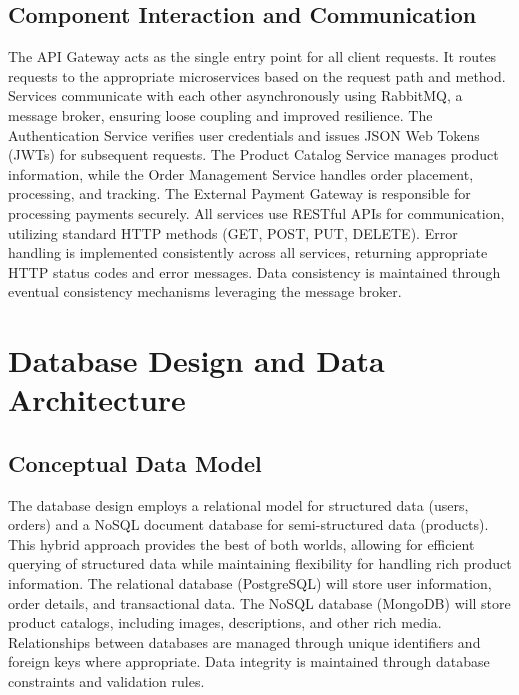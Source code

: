 \documentclass[11pt,a4paper,oneside]{article}
\begin{document}
\subsection{Component Interaction and Communication}

The API Gateway acts as the single entry point for all client requests.  It routes requests to the appropriate microservices based on the request path and method.  Services communicate with each other asynchronously using RabbitMQ, a message broker, ensuring loose coupling and improved resilience.  The Authentication Service verifies user credentials and issues JSON Web Tokens (JWTs) for subsequent requests. The Product Catalog Service manages product information,  while the Order Management Service handles order placement, processing, and tracking. The External Payment Gateway is responsible for processing payments securely.  All services use RESTful APIs for communication, utilizing standard HTTP methods (GET, POST, PUT, DELETE).  Error handling is implemented consistently across all services, returning appropriate HTTP status codes and error messages.  Data consistency is maintained through eventual consistency mechanisms leveraging the message broker.

\section{Database Design and Data Architecture}

\subsection{Conceptual Data Model}

The database design employs a relational model for structured data (users, orders) and a NoSQL document database for semi-structured data (products).  This hybrid approach provides the best of both worlds, allowing for efficient querying of structured data while maintaining flexibility for handling rich product information.  The relational database (PostgreSQL) will store user information, order details, and transactional data.  The NoSQL database (MongoDB) will store product catalogs, including images, descriptions, and other rich media.  Relationships between databases are managed through unique identifiers and foreign keys where appropriate.  Data integrity is maintained through database constraints and validation rules.
\end{document}
